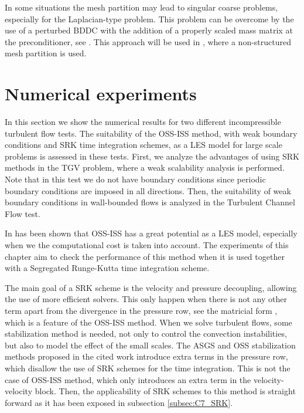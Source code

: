 In some situations the mesh partition may lead to singular coarse problems, especially for the Laplacian-type problem. This problem can be overcome by the use of a perturbed BDDC with the addition of a properly scaled mass matrix at the preconditioner, see \cite{santiago_badia_hieu_nguyen_balancing_2015}. This approach will be used in , where a non-structured mesh partition is used.


\section{Numerical experiments}
\label{sec-C7_experiments}
In this section we show the numerical results for two different incompressible turbulent flow tests. The suitability of the OSS-ISS method, with weak boundary conditions and SRK time integration schemes, as a LES model for large scale problems is assessed in these tests. First, we analyze the advantages of using SRK methods in the TGV problem, where a weak scalability analysis is performed. Note that in this test we do not have boundary conditions since periodic boundary conditions are imposed in all directions. Then, the suitability of weak boundary conditions in wall-bounded flows is analyzed in the Turbulent Channel Flow test. %

In \cite{colomes_mixed_2015} has been shown that OSS-ISS has a great potential as a LES model, especially when we the computational cost is taken into account. The experiments of this chapter aim to check the performance of this method when it is used together with a Segregated Runge-Kutta time integration scheme.

The main goal of a SRK scheme is the velocity and pressure decoupling, allowing the use of more efficient solvers. This only happen when there is not any other term apart from the divergence in the pressure row, see the matricial form , which is a feature of the OSS-ISS method. When we solve turbulent flows, some stabilization method is needed, not only to control the convection instabilities, but also to model the effect of the small scales. The ASGS and OSS stabilization methods proposed in the cited work introduce extra terms in the pressure row, which disallow the use of SRK schemes for the time integration. This is not the case of OSS-ISS method, which only introduces an extra term in the velocity-velocity block. Then, the applicability of SRK schemes to this method is straight forward as it has been exposed in subsection \ref{subsec:C7_SRK}.

